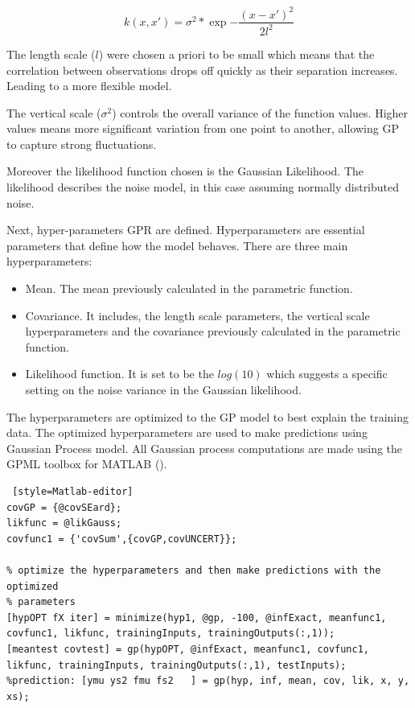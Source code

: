 \begin{equation}\label{seard}
    k(x,x') = \sigma^2*\exp{-\frac{(x-x')^2}{2l^2}}
\end{equation}

The length scale ($l$) were chosen a priori to be small which means that the correlation between observations drops off quickly as their separation increases. Leading to a more flexible model. 

The vertical scale ($\sigma^2$) controls the overall variance of the function values. Higher values means more significant variation from one point to another, allowing GP to capture strong fluctuations. 

Moreover the likelihood function chosen is the Gaussian Likelihood. The likelihood describes the noise model, in this case assuming normally distributed noise. 

Next, hyper-parameters GPR are defined. Hyperparameters are essential parameters that define how the model behaves. There are three main hyperparameters:

\begin{itemize}

    \item Mean. The mean previously calculated in the parametric function.
    \item Covariance. It includes, the length scale parameters, the vertical scale hyperparameters and the covariance previously calculated in the parametric function. 

    \item Likelihood function. It is set to be the $log(10)$ which suggests a specific setting on the noise variance in the Gaussian likelihood. 

\end{itemize}

The hyperparameters are optimized to the GP model to best explain the training data. The optimized hyperparameters are used to make predictions using Gaussian Process model. All Gaussian process computations are made using the GPML toolbox for MATLAB (\cite{GPML}).

\begin{lstlisting} [style=Matlab-editor]
covGP = {@covSEard};
likfunc = @likGauss;
covfunc1 = {'covSum',{covGP,covUNCERT}};

% optimize the hyperparameters and then make predictions with the optimized
% parameters
[hypOPT fX iter] = minimize(hyp1, @gp, -100, @infExact, meanfunc1, covfunc1, likfunc, trainingInputs, trainingOutputs(:,1));
[meantest covtest] = gp(hypOPT, @infExact, meanfunc1, covfunc1, likfunc, trainingInputs, trainingOutputs(:,1), testInputs);
%prediction: [ymu ys2 fmu fs2   ] = gp(hyp, inf, mean, cov, lik, x, y, xs);
\end{lstlisting}

